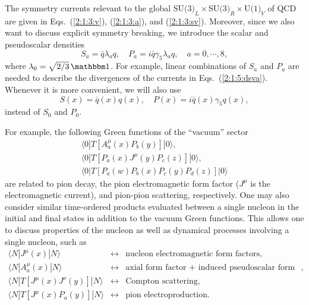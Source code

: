 \documentclass[twoside,12pt]{article}
\begin{document}
   The symmetry currents relevant to the global
$\mbox{SU(3)}_L\times\mbox{SU(3)}_R\times\mbox{U(1)}_V$ of QCD are given
in Eqs.~(\ref{2:1:3:v}), (\ref{2:1:3:a}), and (\ref{2:1:3:sv}).
   Moreover, since we also want to discuss explicit symmetry breaking, we
introduce the scalar and pseudoscalar densities
\begin{equation}
\label{2:1:6:quadraticforms}
S_a=\bar{q}\lambda_a q,\quad
P_a=i\bar{q}\gamma_5 \lambda_a  q,\quad
a=0,\cdots, 8,
\end{equation}
where $\lambda_0=\sqrt{2/3}\,\mathbbm 1$.
   For example, linear combinations of $S_a$ and $P_a$ are needed to describe
the divergences of the currents in Eqs.~(\ref{2:1:5:dsva}).
  Whenever it is more convenient, we will also use
\begin{equation}
\label{2:1:6:SP}
S(x)=\bar{q}(x) q(x),\quad
P(x)=i\bar{q}(x)\gamma_5 q(x),
\end{equation}
instead of $S_0$ and $P_0$.

   For example, the following Green functions of the
``vacuum'' sector
\begin{eqnarray*}
\langle 0|T[A^\mu_a(x) P_b(y)]|0\rangle,\\
\langle 0|T[P_a(x)J^\mu(y) P_c(z)]|0\rangle,\\
\langle 0|T[P_a(w)P_b(x)P_c(y)P_d(z)]|0\rangle
\end{eqnarray*}
are related to pion decay, the pion electromagnetic form factor ($J^\mu$
is the electromagnetic current), and
pion-pion scattering, respectively.
  One may also consider similar time-ordered products
evaluated between a single nucleon in the initial and final states
in addition to the vacuum Green functions.
   This allows one to discuss properties of the nucleon as well as
dynamical processes involving a single nucleon, such as
\begin{eqnarray*}
\langle N|J^\mu(x)|N\rangle&\leftrightarrow&\mbox{nucleon electromagnetic form factors},\\
\langle N|A^\mu_a(x)|N\rangle&\leftrightarrow&\mbox{axial form factor + induced pseudoscalar form factor},\\
\langle N|T[J^\mu(x) J^\nu(y)]|N\rangle&\leftrightarrow&\mbox{Compton scattering},\\
\langle N|T[J^\mu(x) P_a(y)]|N\rangle&\leftrightarrow&\mbox{pion electroproduction}.
\end{eqnarray*}
\end{document}
